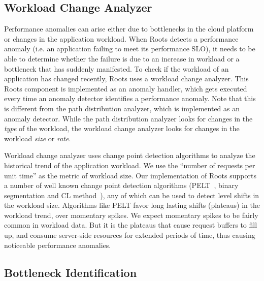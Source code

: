\subsection{Workload Change Analyzer}

Performance anomalies can arise either due to bottlenecks in the cloud platform or 
changes in the application workload.
When Roots detects a performance anomaly (i.e. an application failing to meet its performance SLO),
it needs to be able to determine whether the failure is due
to an increase in workload or a bottleneck that has suddenly manifested.
To check if the workload of an application has changed recently, Roots uses a workload change analyzer.
This Roots component  is implemented as an anomaly handler, which gets executed every time an 
anomaly detector
identifies a performance anomaly. Note that this is different from the path distribution analyzer,
which is implemented as an anomaly detector. While the path distribution analyzer looks for changes in the
\textit{type} of the workload, the workload change analyzer looks for changes
in the workload \textit{size} or \textit{rate}. 

Workload change analyzer uses change point detection algorithms to analyze the historical trend of 
the application workload. We use the ``number of requests
per unit time'' as the metric of workload size. 
Our implementation of Roots supports a number of well known change point
detection algorithms (PELT~\cite{doi:10.1080/01621459.2012.737745}, binary segmentation 
and CL method~\cite{chen1993joint}), any of which can be used to detect level shifts in the
workload size. Algorithms like PELT favor long lasting shifts (plateaus) in the workload trend, over momentary spikes.
We expect momentary spikes to be fairly common in workload data. But it is the plateaus that cause
request buffers to fill up, and consume server-side resources for extended periods of time, thus
causing noticeable performance anomalies.

\subsection{Bottleneck Identification}

